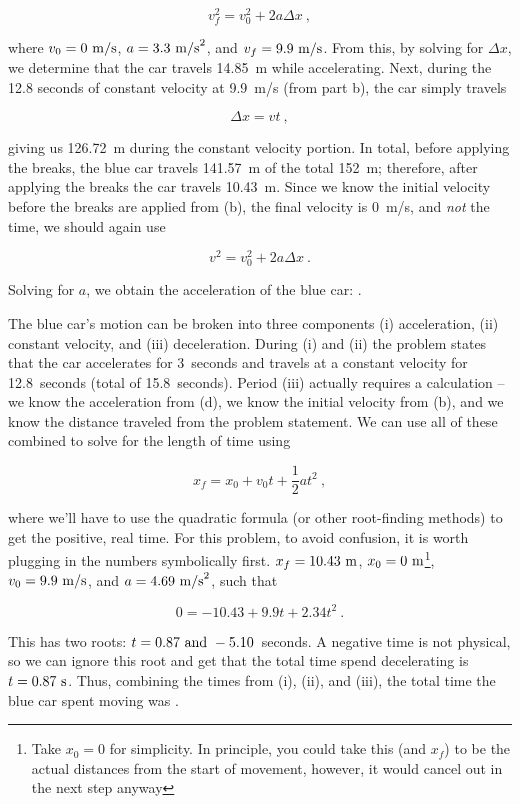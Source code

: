 \documentclass[]{flipit}
\begin{document}
\begin{enumi}
    \[v_f^2 = v_0^2 + 2a\Delta x~,\]

    where $v_0 = 0~{\rm m/s}$, $a=3.3~{\rm m/s}^2$, and $v_f=9.9~{\rm m/s}$.
    From this, by solving for $\Delta x$, we determine that the car travels 14.85~m while accelerating.
    Next, during the 12.8 seconds of constant velocity at 9.9~m/s (from part b), the car simply travels

    \[\Delta x = v t~,\]

    giving us 126.72~m during the constant velocity portion.
    In total, before applying the breaks, the blue car travels 141.57~m of the total 152~m; therefore, after applying the breaks the car travels 10.43~m.
    Since we know the initial velocity before the breaks are applied from (b), the final velocity is 0~m/s, and {\it not} the time, we should again use

    \[v^2 = v_0^2 + 2a\Delta x~.\]

    Solving for $a$, we obtain the acceleration of the blue car: .

    \item The blue car's motion can be broken into three components (i) acceleration, (ii) constant velocity, and (iii) deceleration.
    During (i) and (ii) the problem states that the car accelerates for 3~seconds and travels at a constant velocity for 12.8~seconds (total of 15.8~seconds).
    Period (iii) actually requires a calculation -- we know the acceleration from (d), we know the initial velocity from (b), and we know the distance traveled from the problem statement.
    We can use all of these combined to solve for the length of time using 

    \[x_f = x_0 + v_0 t + \frac12at^2~,\]

    where we'll have to use the quadratic formula (or other root-finding methods) to get the positive, real time.
    For this problem, to avoid confusion, it is worth plugging in the numbers symbolically first.
    $x_f = 10.43~{\rm m}$, $x_0 = 0~{\rm m}$\footnote{Take $x_0=0$ for simplicity. In principle, you could take this (and $x_f$) to be the actual distances from the start of movement, however, it would cancel out in the next step anyway}, $v_0 = 9.9~{\rm m/s}$, and $a = 4.69~{\rm m/s}^2$, such that

    \[0 = -10.43 + 9.9 t + 2.34 t^2~.\]

    This has two roots: $t = 0.87~{\rm and}~-5.10$~seconds. 
    A negative time is not physical, so we can ignore this root and get that the total time spend decelerating is $t = 0.87~{\rm s}$.
    Thus, combining the times from (i), (ii), and (iii), the total time the blue car spent moving was .


\end{enumi}
\end{document}
